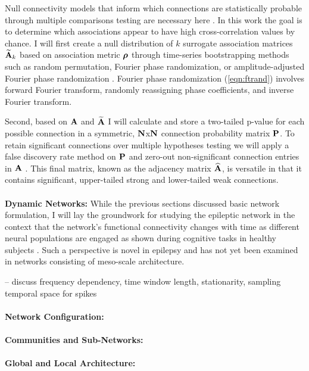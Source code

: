 Null connectivity models that inform which connections are statistically probable through multiple comparisons testing are necessary here \cite{bassett2013robust}. In this work the goal is to determine which associations appear to have high cross-correlation values by chance. I will first create a null distribution of $k$ surrogate association matrices $\widetilde{\mathbf{\displaystyle A}}_k$ based on association metric $\boldsymbol{\displaystyle \rho}$ through time-series bootstrapping methods such as random permutation, Fourier phase randomization, or amplitude-adjusted Fourier phase randomization \cite{bassett2013robust}. Fourier phase randomization (\ref{eqn:ftrand}) involves forward Fourier transform, randomly reassigning phase coefficients, and inverse Fourier transform.

Second, based on $\mathbf{\displaystyle A}$ and $\widetilde{\mathbf{\displaystyle A}}$ I will calculate and store a two-tailed p-value for each possible connection in a symmetric, $\mathbf{\displaystyle N}$x$\mathbf{\displaystyle N}$ connection probability matrix $\mathbf{\displaystyle P}$. To retain significant connections over multiple hypotheses testing we will apply a false discovery rate method on $\mathbf{\displaystyle P}$ and zero-out non-significant connection entries in $\mathbf{\displaystyle A}$ \cite{benjamini2001control}. This final matrix, known as the adjacency matrix $\widehat{\mathbf{\displaystyle A}}$, is versatile in that it contains significant, upper-tailed strong and lower-tailed weak connections.
~\\
~\\
\textbf{Dynamic Networks:}
While the previous sections discussed basic network formulation, I will lay the groundwork for studying the epileptic network in the context that the network's functional connectivity changes with time as different neural populations are engaged as shown during cognitive tasks in healthy subjects \cite{bassett2011dynamic}. Such a perspective is novel in epilepsy and has not yet been examined in networks consisting of meso-scale architecture.

-- discuss frequency dependency, time window length, stationarity, sampling temporal space for spikes 
~\\
~\\
\textbf{Network Configuration:}
~\\
~\\
\textbf{Communities and Sub-Networks:}
~\\
~\\
\textbf{Global and Local Architecture:}


